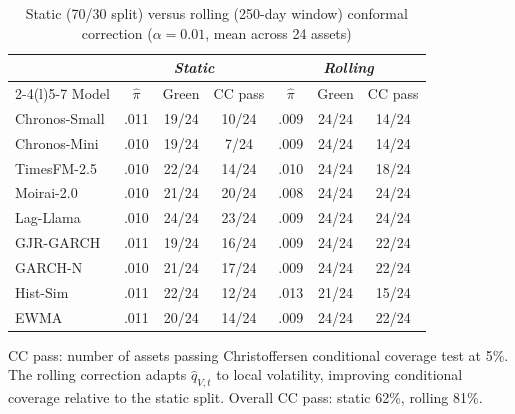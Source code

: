 \begin{table}[H]
	\centering
	\caption{Static (70/30 split) versus rolling (250-day window) conformal correction ($\alpha = 0.01$, mean across 24 assets)}
	\label{tab:rolling_vs_static}
	\footnotesize
	\begin{tabular}{@{}lcccccc@{}}
		\toprule
		& \multicolumn{3}{c}{\textit{Static}} & \multicolumn{3}{c}{\textit{Rolling}} \\
		\cmidrule(lr){2-4}\cmidrule(l){5-7}
		Model & $\hat\pi$ & Green & CC pass & $\hat\pi$ & Green & CC pass \\
		\midrule
		Chronos-Small      & .011 & 19/24 & 10/24 & .009 & 24/24 & 14/24 \\
		Chronos-Mini       & .010 & 19/24 & 7/24 & .009 & 24/24 & 14/24 \\
		TimesFM-2.5        & .010 & 22/24 & 14/24 & .010 & 24/24 & 18/24 \\
		Moirai-2.0         & .010 & 21/24 & 20/24 & .008 & 24/24 & 24/24 \\
		Lag-Llama          & .010 & 24/24 & 23/24 & .009 & 24/24 & 24/24 \\
		\midrule
		GJR-GARCH          & .011 & 19/24 & 16/24 & .009 & 24/24 & 22/24 \\
		GARCH-N            & .010 & 21/24 & 17/24 & .009 & 24/24 & 22/24 \\
		Hist-Sim           & .011 & 22/24 & 12/24 & .013 & 21/24 & 15/24 \\
		EWMA               & .011 & 20/24 & 14/24 & .009 & 24/24 & 22/24 \\
		\bottomrule
	\end{tabular}
	\begin{minipage}{\linewidth}\scriptsize
		\smallskip
		CC pass: number of assets passing Christoffersen conditional coverage test at 5\%. The rolling correction adapts $\hat{q}_{V,t}$ to local volatility, improving conditional coverage relative to the static split. Overall CC pass: static 62\%, rolling 81\%.
	\end{minipage}
\end{table}